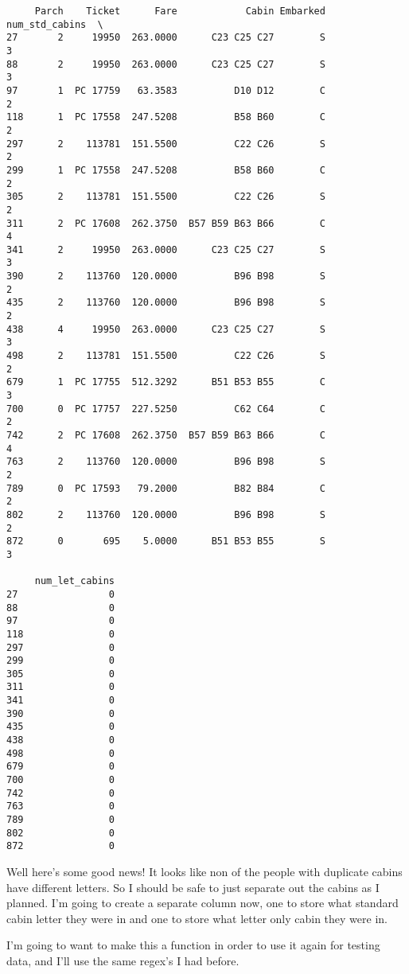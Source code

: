 \documentclass[11pt]{article}
\begin{document}
\begin{verbatim}
     Parch    Ticket      Fare            Cabin Embarked  num_std_cabins  \
27       2     19950  263.0000      C23 C25 C27        S               3   
88       2     19950  263.0000      C23 C25 C27        S               3   
97       1  PC 17759   63.3583          D10 D12        C               2   
118      1  PC 17558  247.5208          B58 B60        C               2   
297      2    113781  151.5500          C22 C26        S               2   
299      1  PC 17558  247.5208          B58 B60        C               2   
305      2    113781  151.5500          C22 C26        S               2   
311      2  PC 17608  262.3750  B57 B59 B63 B66        C               4   
341      2     19950  263.0000      C23 C25 C27        S               3   
390      2    113760  120.0000          B96 B98        S               2   
435      2    113760  120.0000          B96 B98        S               2   
438      4     19950  263.0000      C23 C25 C27        S               3   
498      2    113781  151.5500          C22 C26        S               2   
679      1  PC 17755  512.3292      B51 B53 B55        C               3   
700      0  PC 17757  227.5250          C62 C64        C               2   
742      2  PC 17608  262.3750  B57 B59 B63 B66        C               4   
763      2    113760  120.0000          B96 B98        S               2   
789      0  PC 17593   79.2000          B82 B84        C               2   
802      2    113760  120.0000          B96 B98        S               2   
872      0       695    5.0000      B51 B53 B55        S               3   

     num_let_cabins  
27                0  
88                0  
97                0  
118               0  
297               0  
299               0  
305               0  
311               0  
341               0  
390               0  
435               0  
438               0  
498               0  
679               0  
700               0  
742               0  
763               0  
789               0  
802               0  
872               0  
    \end{verbatim}

    
    Well here's some good news! It looks like non of the people with
duplicate cabins have different letters. So I should be safe to just
separate out the cabins as I planned. I'm going to create a separate
column now, one to store what standard cabin letter they were in and one
to store what letter only cabin they were in.

I'm going to want to make this a function in order to use it again for
testing data, and I'll use the same regex's I had before.
\end{document}
